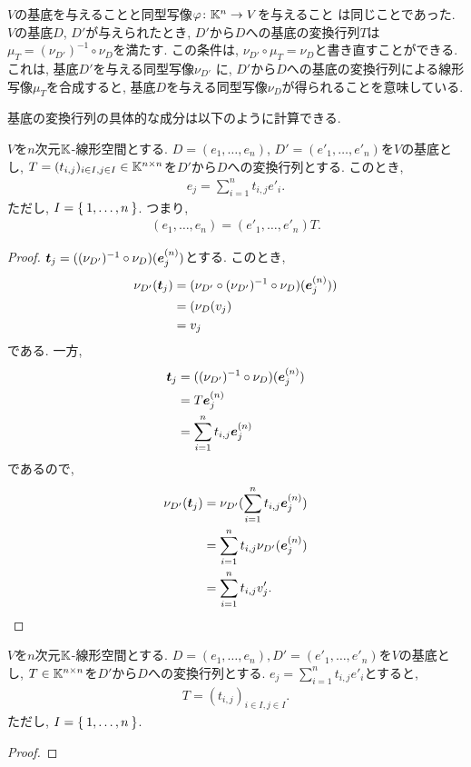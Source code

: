 \begin{remark}
  $V$の基底を与えることと同型写像$\varphi\colon \mathbb{K}^n\to V$を与えること
  は同じことであった.
  $V$の基底$D$, $D'$が与えられたとき, $D'$から$D$への基底の変換行列$T$は
  $\mu_T=(\nu_{D'})^{-1}\circ\nu_{D}$を満たす.
  この条件は,
  $\nu_{D'}\circ\mu_T=\nu_{D}$と書き直すことができる.
  これは,
  基底$D'$を与える同型写像$\nu_{D'}$
  に, $D'$から$D$への基底の変換行列による線形写像$\mu_T$を合成すると,
  基底$D$を与える同型写像$\nu_{D}$が得られることを意味している.
\end{remark}
基底の変換行列の具体的な成分は以下のように計算できる.
\begin{prop}
  \label{thm:trasmat:description}
  $V$を$n$次元$\mathbb{K}$-線形空間とする.
  $D=(e_1,\ldots, e_n)$,
  $D'=(e'_1,\ldots, e'_n)$を$V$の基底とし,
  $T=(t_{i,j})_{i\in I, j\in I}\in\mathbb{K}^{n\times n}$を$D'$から$D$への変換行列とする.
  このとき,
  \begin{align*}
    e_j=\sum_{i=1}^n t_{i,j}e'_i.
  \end{align*}
  ただし, $I=\Set{1,\ldots, n} $.
  つまり,
  \begin{align*}
    (e_1,\ldots, e_n)=(e'_1,\ldots, e'_n)T.
  \end{align*}
\end{prop}
\begin{proof}
  $\boldsymbol{t}_j=((\nu_{D'})^{-1}\circ\nu_{D})(\boldsymbol{e}^{(n)}_j)$とする.
  このとき,
  \begin{align*}
     \nu_{D'}(\boldsymbol{t}_j)
    &=(\nu_{D'}\circ(\nu_{D'})^{-1}\circ\nu_{D})(\boldsymbol{e}^{(n)}_j))\\
    &=(\nu_{D}(v_j)\\
    &=v_j
  \end{align*}
  である.
  一方,
  \begin{align*}
    \boldsymbol{t}_j&=((\nu_{D'})^{-1}\circ\nu_{D})(\boldsymbol{e}^{(n)}_j)\\
    &=T\boldsymbol{e}^{(n)}_j\\
    &=\sum_{i=1}^n t_{i,j}\boldsymbol{e}^{(n)}_j
  \end{align*}
  であるので,
  \begin{align*}
    \nu_{D'}(\boldsymbol{t}_j)
    &=\nu_{D'}(\sum_{i=1}^n t_{i,j}\boldsymbol{e}^{(n)}_j)\\
    &=\sum_{i=1}^n t_{i,j}\nu_{D'}(\boldsymbol{e}^{(n)}_j)\\
    &=\sum_{i=1}^n t_{i,j}v'_j.
  \end{align*}
\end{proof}

\begin{prop}
  $V$を$n$次元$\mathbb{K}$-線形空間とする.
  $D=(e_1,\ldots, e_n),D'=(e'_1,\ldots, e'_n)$を$V$の基底とし,
  $T\in\mathbb{K}^{n\times n}$を$D'$から$D$への変換行列とする.
  $e_j=\sum_{i=1}^n t_{i,j}e'_i$とすると,
  \begin{align*}
    T=(t_{i,j})_{i\in I, j\in I}.
  \end{align*}
  ただし, $I=\Set{1,\ldots, n} $.
\end{prop}
\begin{proof}\end{proof}

